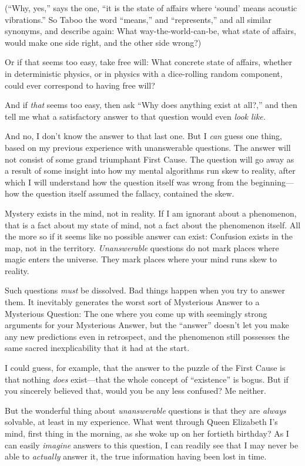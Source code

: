 {
 (``Why, yes,'' says the one,
``it is the state of affairs where
`sound' means acoustic
vibrations.'' So Taboo the word
``means,'' and
``represents,'' and all similar
synonyms, and describe again: What way-the-world-can-be, what state of
affairs, would make one side right, and the other side wrong?)}

{
 Or if that seems too easy, take free will: What concrete state of
affairs, whether in deterministic physics, or in physics with a
dice-rolling random component, could ever correspond to having free
will?}

{
 And if \textit{that} seems too easy, then ask
``Why does anything exist at all?,''
and then tell me what a satisfactory answer to that question would even
\textit{look like.}}

{
 And no, I don't know the answer to that last one.
But I \textit{can} guess one thing, based on my previous experience
with unanswerable questions. The answer will not consist of some grand
triumphant First Cause. The question will go away as a result of some
insight into how my mental algorithms run skew to reality, after which
I will understand how the question itself was wrong from the
beginning---how the question itself assumed the fallacy, contained the
skew.}

{
 Mystery exists in the mind, not in reality. If I am ignorant about
a phenomenon, that is a fact about my state of mind, not a fact about
the phenomenon itself. All the more so if it seems like no possible
answer can exist: Confusion exists in the map, not in the territory.
\textit{Unanswerable} questions do not mark places where magic enters
the universe. They mark places where your mind runs skew to reality.}

{
 Such questions \textit{must} be dissolved. Bad things happen when
you try to answer them. It inevitably generates the worst sort of
Mysterious Answer to a Mysterious Question: The one where you come up
with seemingly strong arguments for your Mysterious Answer, but the
``answer'' doesn't
let you make any new predictions even in retrospect, and the phenomenon
still possesses the same sacred inexplicability that it had at the
start.}

{
 I could guess, for example, that the answer to the puzzle of the
First Cause is that nothing \textit{does} exist---that the whole
concept of ``existence'' is bogus.
But if you sincerely believed that, would you be any less confused? Me
neither.}

{
 But the wonderful thing about \textit{unanswerable} questions is
that they are \textit{always} solvable, at least in my experience. What
went through Queen Elizabeth I's mind, first thing in
the morning, as she woke up on her fortieth birthday? As I can easily
\textit{imagine} answers to this question, I can readily see that I may
never be able to \textit{actually} answer it, the true information
having been lost in time.}


